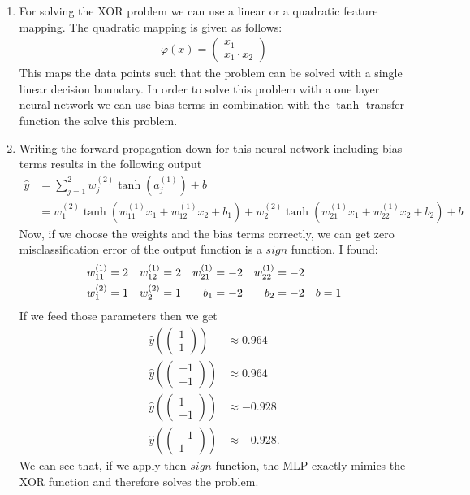 \documentclass[12pt]{article}
\begin{document}
\begin{enumerate}
	\begin{enumerate}[label=(\alph*)]
		\item 
		For solving the XOR problem we can use a linear or a quadratic feature mapping. The quadratic mapping is given as follows:
		\begin{align}
			\varphi(x)= 
			\begin{pmatrix}
				x_1 \\ x_1\cdot x_2
			\end{pmatrix}
		\end{align}
		This maps the data points such that the problem can be solved with a single linear decision boundary. In order to solve this problem with a one layer neural network we can use bias terms in combination with the $\tanh$ transfer function the solve this problem.
		\item 
		Writing the forward propagation down for this neural network including bias terms results in the following output
		\begin{align}
			\hat{y}&=\sum_{j=1}^{2}w^{(2)}_j\tanh(a^{(1)}_j) + b \\
			&= w^{(2)}_1 \tanh(w^{(1)}_{11}x_{1} + w^{(1)}_{12}x_{2}+b_1) + w^{(2)}_2 \tanh(w^{(1)}_{21} x_1 + w^{(1)}_{22}x_2 + b_2) +b
		\end{align} 
		Now, if we choose the weights and the bias terms correctly, we can get zero misclassification error of the output function is a $sign$ function.
		I found: 
		\begin{align}
			w^{(1)}_{11} = 2 && w^{(1)}_{12} = 2 && w^{(1)}_{21} = -2 && w^{(1)}_{22} = -2 \notag \\ w^{(2)}_1 = 1 && w^{(2)}_2 = 1 && b_1 = -2 && b_2 = -2 && b = 1
		\end{align}
		If we feed those parameters then we get
		\begin{align}
			\hat{y}(\begin{pmatrix}
				1 \\ 1 
			\end{pmatrix}) &\approx 0.964 \\ 
			\hat{y}(\begin{pmatrix}
			-1 \\ -1 
			\end{pmatrix}) &\approx 0.964 \\ 
			\hat{y}(\begin{pmatrix}
			1 \\ -1 
			\end{pmatrix}) &\approx -0.928 \\ 
			\hat{y}(\begin{pmatrix}
			-1 \\ 1 
			\end{pmatrix}) &\approx -0.928.
		\end{align}
		We can see that, if we apply then $sign$ function, the MLP exactly mimics the XOR function and therefore solves the problem.
	\end{enumerate}
\end{enumerate}
\end{document}
